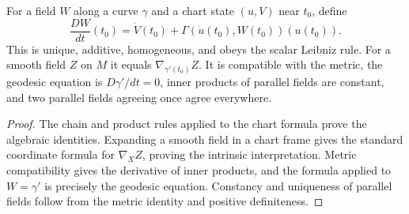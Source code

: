 \begin{lemma}
\label{lem:cov-deriv-along-curve}





For a field $W$ along a curve $\gamma$ and a chart state $(u,V)$ near
$t_0$, define
$$\frac{DW}{dt}(t_0)=\dot V(t_0)
+\Gamma(\dot u(t_0),W(t_0))(u(t_0)).$$
This is unique, additive, homogeneous, and obeys the scalar Leibniz
rule. For a smooth field $Z$ on $M$ it equals
$\nabla_{\gamma'(t_0)}Z$. It is compatible with the metric, the geodesic
equation is $D\gamma'/dt=0$, inner products of parallel fields are
constant, and two parallel fields agreeing once agree everywhere.
\end{lemma}
\begin{proof}
\sketch

The chain and product rules applied to the chart formula prove the
algebraic identities. Expanding a smooth field in a chart frame gives
the standard coordinate formula for $\nabla_XZ$, proving the intrinsic
interpretation. Metric compatibility gives the derivative of inner
products, and the formula applied to $W=\gamma'$ is precisely the
geodesic equation. Constancy and uniqueness of parallel fields follow
from the metric identity and positive definiteness.
\end{proof}


